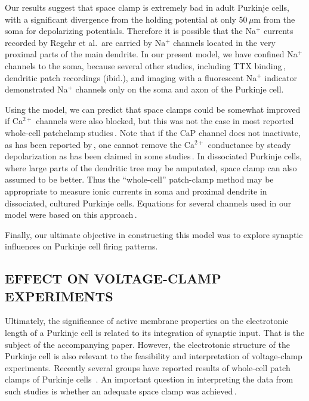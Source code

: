 \documentclass[12pt]{article}
\begin{document}
Our results suggest that space clamp is extremely bad in
adult Purkinje cells, with a significant divergence from the
holding potential at only 50\,$\mu$m from the soma for depolarizing
potentials. Therefore it is possible that the Na$^+$
currents recorded by Regehr et al.\,\cite{Regehr:1992tg} are carried by
Na$^+$ channels located in the very proximal parts of the
main dendrite. In our present model, we have confined
Na$^+$ channels to the soma, because several other studies,
including TTX binding\,\cite{Llinas:1992rq}, dendritic
patch recordings (ibid.), and imaging with a fluorescent
Na$^+$ indicator\,\cite{Lasser-Ross:1992ij} demonstrated
Na$^+$ channels only on the soma and axon of the
Purkinje cell.

Using the model, we can predict that space clamps could
be somewhat improved if Ca$^{2+}$ channels were also blocked,
but this was not the case in most reported whole-cell patchclamp
studies\,\cite{Kaneda:1990ys, Llano:1991qf, Regan:1991ly, Regehr:1992tg}. 
Note that if the CaP channel
does not inactivate, as has been reported by\,\cite{Usowicz:1992qf}, 
one cannot remove the Ca$^{2+}$ conductance by
steady depolarization as has been claimed in some studies\,\cite{Llano:1991qf}. 
In dissociated Purkinje cells, where
large parts of the dendritic tree may be amputated, space
clamp can also assumed to be better. Thus the ``whole-cell''
patch-clamp method may be appropriate to measure ionic
currents in soma and proximal dendrite in dissociated, cultured
Purkinje cells. Equations for several channels used in
our model were based on this approach\,\cite{Hirano:1989uq, Kaneda:1990ys, Regan:1991ly}.

Finally, our ultimate objective in constructing this model
was to explore synaptic influences on Purkinje cell firing
patterns.

\subsection*{EFFECT ON VOLTAGE-CLAMP EXPERIMENTS}

Ultimately, the significance of active membrane properties on the electrotonic
length of a Purkinje cell is related to its integration of
synaptic input. That is the subject of the accompanying
paper. However, the electrotonic structure of the Purkinje
cell is also relevant to the feasibility and interpretation of
voltage-clamp experiments. Recently several groups have
reported results of whole-cell patch clamps of Purkinje cells
\,\cite{Hirano:1989uq, Kaneda:1990ys, Llano:1991qf, Regan:1991ly, Regehr:1992tg}. 
An important question in interpreting the data from such studies is
whether an adequate space clamp was achieved\,\cite{Rall:1985ys}.
\end{document}
